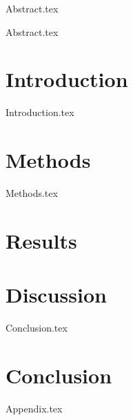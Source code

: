 \documentclass[master]{NTNUthesis}
\begin{document}
\makecover


\begin{abstractZH}
    {Abstract.tex}
\end{abstractZH}

\begin{abstractEN}
    {Abstract.tex}
\end{abstractEN}

\maketoc


\chapter{Introduction}
{Introduction.tex}

\chapter{Methods}
{Methods.tex}

\chapter{Results}

\chapter{Discussion}
{Conclusion.tex}

\chapter{Conclusion}

{Appendix.tex}



\end{document}
